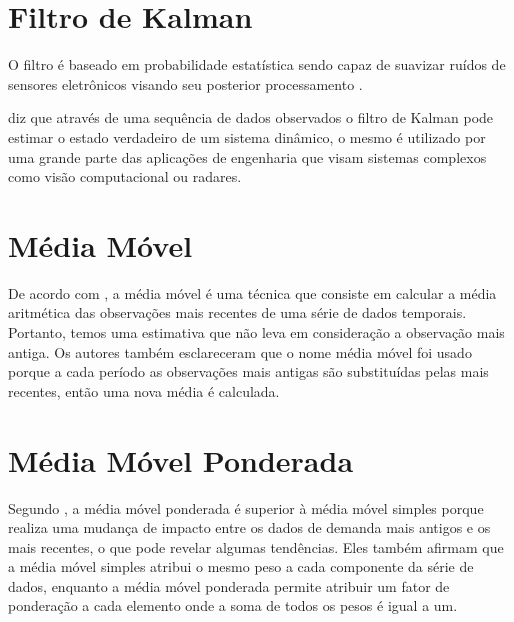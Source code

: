 \section{ Filtro de Kalman}

O filtro é baseado em probabilidade estatística sendo capaz de suavizar ruídos de sensores eletrônicos visando seu posterior processamento \cite{International_Conference__Zhuang}.


\cite{tan2005sensoclean} diz que através de uma sequência de dados observados o filtro de Kalman pode estimar o estado verdadeiro de um sistema dinâmico, o mesmo é utilizado por uma grande parte das aplicações de engenharia que visam sistemas complexos como visão computacional ou radares. 
 

\section{Média Móvel}
De acordo com \cite{santos2021educaccao}, a média móvel é uma técnica que consiste em calcular a média aritmética das observações mais recentes de uma série de dados temporais. Portanto, temos uma estimativa que não leva em consideração a observação mais antiga. Os autores também esclareceram que o nome média móvel foi usado porque a cada período as observações mais antigas são substituídas pelas mais recentes, então uma nova média é calculada.


\section{Média Móvel Ponderada}
Segundo \cite{ribeiro2020analise}, a média móvel ponderada é superior à média móvel simples porque realiza uma mudança de impacto entre os dados de demanda mais antigos e os mais recentes, o que pode revelar algumas tendências. Eles também afirmam que a média móvel simples atribui o mesmo peso a cada componente da série de dados, enquanto a média móvel ponderada permite atribuir um fator de ponderação a cada elemento onde a soma de todos os pesos é igual a um.




